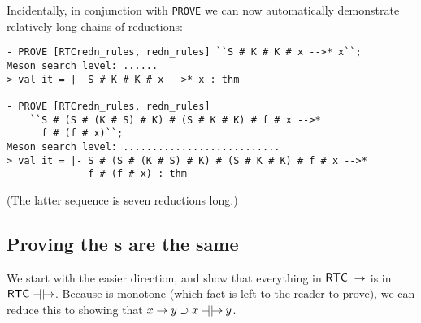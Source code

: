 Incidentally, in conjunction with \texttt{PROVE} we can now
automatically demonstrate relatively long chains of reductions:
\begin{session}\begin{verbatim}
- PROVE [RTCredn_rules, redn_rules] ``S # K # K # x -->* x``;
Meson search level: ......
> val it = |- S # K # K # x -->* x : thm

- PROVE [RTCredn_rules, redn_rules]
    ``S # (S # (K # S) # K) # (S # K # K) # f # x -->*
      f # (f # x)``;
Meson search level: ...........................
> val it = |- S # (S # (K # S) # K) # (S # K # K) # f # x -->*
              f # (f # x) : thm
\end{verbatim}\end{session}
(The latter sequence is seven reductions long.)


\subsection{Proving the s are the same}
\label{sec:Proving-RTCs-same}

We start with the easier direction, and show that everything in
${\sf RTC}\;\rightarrow$ is in ${\sf RTC}\;\mathbin{-\!\!\!\mid\mid\!\rightarrow}$.  Because
 is monotone (which fact is left to the reader to prove),
we can reduce this to showing that $x\rightarrow y\supset
x\mathbin{-\!\!\!\mid\mid\!\rightarrow} y$.

